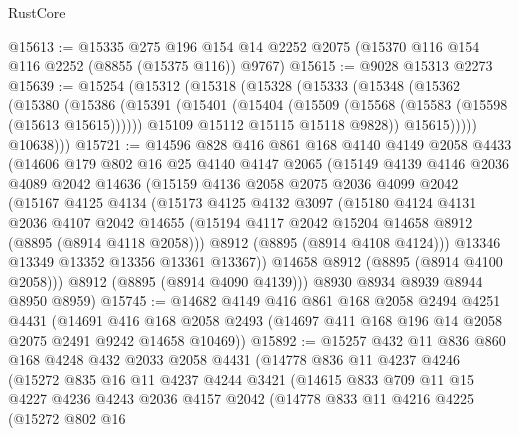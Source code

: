 \begin{lexlean}{RustCore}
\begin{coremodule}
@15613 := @15335
    @275
    @196
    @154
    @14
    @2252
    @2075
    (@15370 @116 @154 @116 @2252 (@8855 (@15375 @116)) @9767)
@15615 := @9028 @15313 @2273
@15639 := @15254
    (@15312
      (@15318
        (@15328
          (@15333
            (@15348
              (@15362
                (@15380
                  (@15386
                    (@15391
                      (@15401
                        (@15404 (@15509 (@15568 (@15583 (@15598 (@15613 @15615))))))
                        @15109
                        @15112
                        @15115
                        @15118
                        @9828))
                    @15615)))))
          @10638)))
@15721 := @14596
    @828
    @416
    @861
    @168
    @4140
    @4149
    @2058
    @4433
    (@14606
      @179
      @802
      @16
      @25
      @4140
      @4147
      @2065
      (@15149
        @4139
        @4146
        @2036
        @4089
        @2042
        @14636
        (@15159
          @4136
          @2058
          @2075
          @2036
          @4099
          @2042
          (@15167
            @4125
            @4134
            (@15173
              @4125
              @4132
              @3097
              (@15180
                @4124
                @4131
                @2036
                @4107
                @2042
                @14655
                (@15194 @4117 @2042 @15204 @14658 @8912 (@8895 (@8914 @4118 @2058)))
                @8912
                (@8895 (@8914 @4108 @4124)))
              @13346
              @13349
              @13352
              @13356
              @13361
              @13367))
          @14658
          @8912
          (@8895 (@8914 @4100 @2058)))
        @8912
        (@8895 (@8914 @4090 @4139)))
      @8930
      @8934
      @8939
      @8944
      @8950
      @8959)
@15745 := @14682
    @4149
    @416
    @861
    @168
    @2058
    @2494
    @4251
    @4431
    (@14691 @416 @168 @2058 @2493 (@14697 @411 @168 @196 @14 @2058 @2075 @2491 @9242 @14658 @10469))
@15892 := @15257
    @432
    @11
    @836
    @860
    @168
    @4248
    @432
    @2033
    @2058
    @4431
    (@14778
      @836
      @11
      @4237
      @4246
      (@15272
        @835
        @16
        @11
        @4237
        @4244
        @3421
        (@14615
          @833
          @709
          @11
          @15
          @4227
          @4236
          @4243
          @2036
          @4157
          @2042
          (@14778
            @833
            @11
            @4216
            @4225
            (@15272
              @802
              @16

\end{coremodule}
\end{lexlean}
